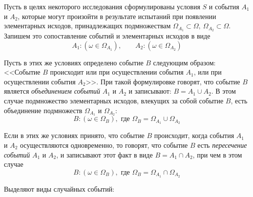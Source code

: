 \documentclass[polytech/stats/exam-2023/stats-exam-2023.tex]{subfiles}
\begin{document}
    Пусть в целях некоторого исследования сформулированы условия $S$ и события $A_1$ и $A_2$, которые могут
    произойти в результате испытаний при появлении элементарных исходов, принадлежащих подмножествам
    $\Omega_{A_1} \subset \Omega, \ \Omega_{A_2} \subset \Omega$. Запишем это сопоставление событий и элементарных
    исходов в виде
    \begin{equation*}
        A_1 : \left(\omega \in \Omega_{A_1}\right), \qquad A_2 : \left(\omega \in \Omega_{A_2}\right)
    \end{equation*}
    \begin{definition}
        Пусть в этих же условиях определено событие $B$ следующим образом: <<Событие $B$ происходит или при осуществлении
        события $A_1$, или при осуществлении события $A_2$>>. При такой формулировке говорят, что событие $B$ является
        \textit{объединением событий} $A_1$ и $A_2$ и записывают: $B = A_1 \cup A_2$. В этом случае подмножество элементарных
        исходов, влекущих за собой событие $B$, есть объединение подмножеств $\Omega_{A_1}$ и $\Omega_{A_2}$:
        \begin{equation*}
            B: \left(\omega \in \Omega_{B}\right), \text{ где } \Omega_B = \Omega_{A_1} \cup \Omega_{A_2}
        \end{equation*}
    \end{definition}
    \begin{definition}
        Если в этих же условиях принято, что событие $B$ происходит, когда события $A_1$ и $A_2$ осуществляются одновременно,
        то говорят, что событие $B$ есть \textit{пересечение событий} $A_1$ и $A_2$, и записывают этот факт в виде $B = A_1 \cap A_2$,
        при чем в этом случае 
        \begin{equation*}
            B: \left(\omega \in \Omega_{B}\right), \text{ где } \Omega_B = \Omega_{A_1} \cap \Omega_{A_2}
        \end{equation*}
    \end{definition}
    Выделяют виды случайных событий:
\end{document}
